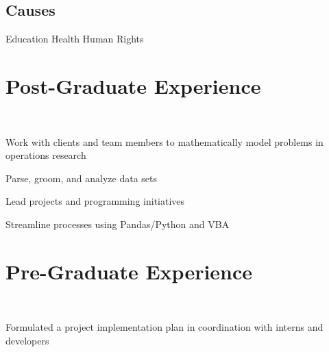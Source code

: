 \documentclass[]{deedy-resume-openfont}
\begin{document}
\begin{minipage}[t]{0.33\textwidth}
\subsection{Causes}
Education \textbullet{} Health \textbullet{} Human Rights \\
\sectionsep


%
%

\end{minipage} 
\hfill
\begin{minipage}[t]{0.66\textwidth} 


\section{Post-Graduate Experience}

 \\
\vspace{\topsep} %
\begin{tightemize}\item Work with clients and team members to mathematically model problems in operations research
\item Parse, groom, and analyze data sets
\item Lead projects and programming initiatives
\item Streamline processes using Pandas/Python and VBA
\end{tightemize}
\sectionsep

\sectionsep

\section{Pre-Graduate Experience}
 \\
\begin{tightemize}\item Formulated a project implementation plan in coordination with interns and developers
\end{tightemize}
\sectionsep


\end{minipage}
\end{document}
